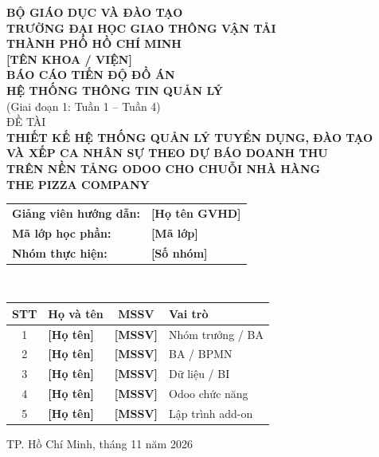 \documentclass[12pt,a4paper,oneside]{report}
\newcommand{\todo}[1]{\textcolor{warn}{\textbf{[#1]}}}
\begin{document}
\begin{titlepage}
\begin{center}
{\large\bfseries BỘ GIÁO DỤC VÀ ĐÀO TẠO\\ TRƯỜNG ĐẠI HỌC GIAO THÔNG VẬN TẢI\\ THÀNH PHỐ HỒ CHÍ MINH}\\[2pt]
{\large\bfseries \todo{TÊN KHOA / VIỆN}}\\[1.6cm]
{\Large\bfseries BÁO CÁO TIẾN ĐỘ ĐỒ ÁN\\[4pt] HỆ THỐNG THÔNG TIN QUẢN LÝ}\\[0.4cm]
{\large (Giai đoạn 1: Tuần 1 – Tuần 4)}\\[1.4cm]
{\large ĐỀ TÀI}\\[6pt]
{\Large\bfseries\color{tpcblue} THIẾT KẾ HỆ THỐNG QUẢN LÝ TUYỂN DỤNG, ĐÀO TẠO\\[3pt]
VÀ XẾP CA NHÂN SỰ THEO DỰ BÁO DOANH THU\\[3pt] TRÊN NỀN TẢNG ODOO CHO CHUỖI NHÀ HÀNG\\[3pt]
THE PIZZA COMPANY}\\[1.6cm]
\begin{tabular}{ll}
\textbf{Giảng viên hướng dẫn:} & \todo{Họ tên GVHD} \\
\textbf{Mã lớp học phần:} & \todo{Mã lớp} \\
\textbf{Nhóm thực hiện:} & \todo{Số nhóm}
\end{tabular}\\[0.8cm]
\begin{tabular}{|c|l|c|l|}
\hline \textbf{STT} & \textbf{Họ và tên} & \textbf{MSSV} & \textbf{Vai trò} \\\hline
1 & \todo{Họ tên} & \todo{MSSV} & Nhóm trưởng / BA \\\hline
2 & \todo{Họ tên} & \todo{MSSV} & BA / BPMN \\\hline
3 & \todo{Họ tên} & \todo{MSSV} & Dữ liệu / BI \\\hline
4 & \todo{Họ tên} & \todo{MSSV} & Odoo chức năng \\\hline
5 & \todo{Họ tên} & \todo{MSSV} & Lập trình add-on \\\hline
\end{tabular}
\vfill
{\large TP. Hồ Chí Minh, tháng 11 năm 2026}
\end{center}
\end{titlepage}

\tableofcontents
\listoffigures
\listoftables
\end{document}
